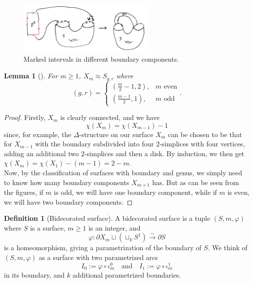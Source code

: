 \documentclass[reqno]{amsart}
\newtheorem{lemma}[theorem]{Lemma}
\theoremstyle{definition}
\newtheorem{definition}[theorem]{Definition}
\theoremstyle{remark}
\begin{document}
\begin{figure}[H]
    \centering
    \includegraphics[width=0.6\textwidth]{bidecorated-second-attaching.jpeg}
    \caption{Marked intervals in different boundary components.}
    \label{fig:bidecorated-second-attaching-jpeg}
\end{figure}

\begin{lemma}[]
    For $m\ge 1$, $X_m \approx S_{g,r}$ where
    \[
        \left( g,r \right) =
        \begin{cases}
            \left( \frac{m}{2}-1,2 \right) ,& m \text{ even}\\
            \left( \frac{m-1}{2},1 \right) ,& m \text{ odd}
        \end{cases}.
    \] 
\end{lemma}

\begin{proof}
    Firstly, $X_m$ is clearly connected, and
    we have
    \[
    \chi \left( X_{m} \right) 
    = \chi \left( X_{m-1} \right) -1
    \] 
    since, for example, the $\Delta$-structure on
    our surface $X_{m}$ can be chosen to be that for $X_{m-1}$ with
    the boundary subdivided into four $2$-simplices with 
    four vertices,
    adding an additional two $2$-simplices and then
    a disk.
    By induction, we then get
    $\chi \left( X_{m} \right) 
    = \chi \left( X_1 \right) - \left( m-1 \right) 
    = 2-m$.\\
    Now, by the classification of surfaces with
    boundary and genus, we simply need to
    know how many boundary components $X_{m+1}$ has.
    But as can be seen from the figures, 
    if $m$ is odd, we will have one boundary component,
    while if  $m$ is even, we will have
    two boundary components.
\end{proof}

\begin{definition}[Bidecorated surface]
    A bidecorated surface is a tuple
    $\left( S, m , \varphi  \right) $ where
    $S$ is a surface, $m\ge 1$ is an integer,
    and
    \[
    \varphi \colon
    \partial X_m \sqcup \left( \sqcup_{k} S^{1} \right) 
    \stackrel{\sim}{\to } \partial S
    \] 
    is a homeomorphism, giving a parametrization of the boundary of
    $S$. We think of $\left( S, m , \varphi  \right) $ as
    a surface with two parametrized arcs
    \[
    I_0 := \varphi \circ \iota_{m}^{0} \quad
    \text{and} \quad 
    I_1 := \varphi \circ \iota_m^{1}
    \] 
    in its boundary, and $k$ additional parametrized
    boundaries.
\end{definition}
\end{document}
